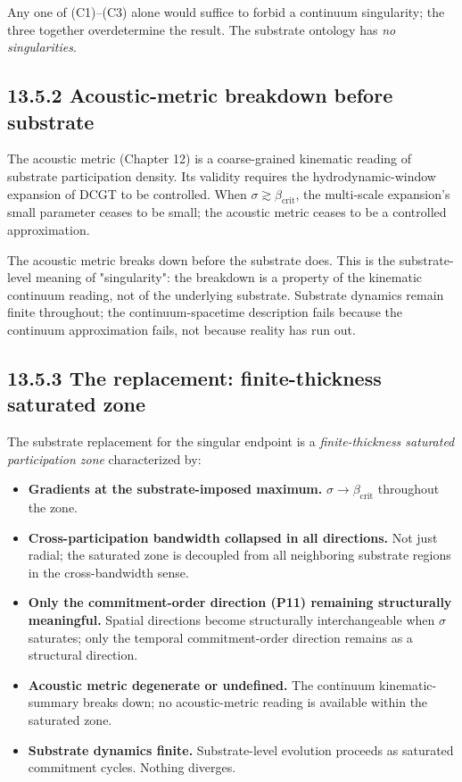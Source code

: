 \documentclass[11pt]{book}
\begin{document}
Any one of (C1)–(C3) alone would suffice to forbid a continuum singularity; the three together overdetermine the result. The substrate ontology has \textit{no singularities}.

\subsection{13.5.2 Acoustic-metric breakdown before substrate}

The acoustic metric (Chapter 12) is a coarse-grained kinematic reading of substrate participation density. Its validity requires the hydrodynamic-window expansion of DCGT to be controlled. When $\sigma \gtrsim \beta_\mathrm{crit}$, the multi-scale expansion's small parameter ceases to be small; the acoustic metric ceases to be a controlled approximation.

The acoustic metric breaks down before the substrate does. This is the substrate-level meaning of "singularity": the breakdown is a property of the kinematic continuum reading, not of the underlying substrate. Substrate dynamics remain finite throughout; the continuum-spacetime description fails because the continuum approximation fails, not because reality has run out.

\subsection{13.5.3 The replacement: finite-thickness saturated zone}

The substrate replacement for the singular endpoint is a \textit{finite-thickness saturated participation zone} characterized by:

\begin{itemize}
\item \textbf{Gradients at the substrate-imposed maximum.} $\sigma \to \beta_\mathrm{crit}$ throughout the zone.
\item \textbf{Cross-participation bandwidth collapsed in all directions.} Not just radial; the saturated zone is decoupled from all neighboring substrate regions in the cross-bandwidth sense.
\item \textbf{Only the commitment-order direction (P11) remaining structurally meaningful.} Spatial directions become structurally interchangeable when $\sigma$ saturates; only the temporal commitment-order direction remains as a structural direction.
\item \textbf{Acoustic metric degenerate or undefined.} The continuum kinematic-summary breaks down; no acoustic-metric reading is available within the saturated zone.
\item \textbf{Substrate dynamics finite.} Substrate-level evolution proceeds as saturated commitment cycles. Nothing diverges.
\end{itemize}
\end{document}
